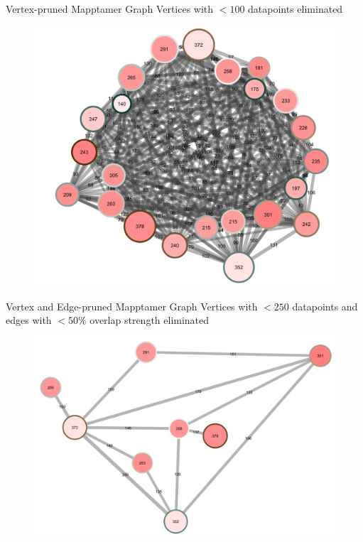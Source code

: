 \documentclass{beamer}
\begin{document}
\begin{frame}{Vertex-pruned Mapptamer Graph}
  Vertices with $<100$ datapoints eliminated
  \begin{figure}
    \begin{center}
      \includegraphics[width=.8\textwidth]{vertexpruned.png}
    \end{center}
  \end{figure}
\end{frame}

\begin{frame}{Vertex and Edge-pruned Mapptamer Graph}
  Vertices with $<250$ datapoints and edges with $<50\%$ overlap strength eliminated
  \begin{figure}
    \begin{center}
      \includegraphics[width=.9\textwidth]{vertexandedgeprune.png}
    \end{center}
  \end{figure}
\end{frame}
\end{document}
